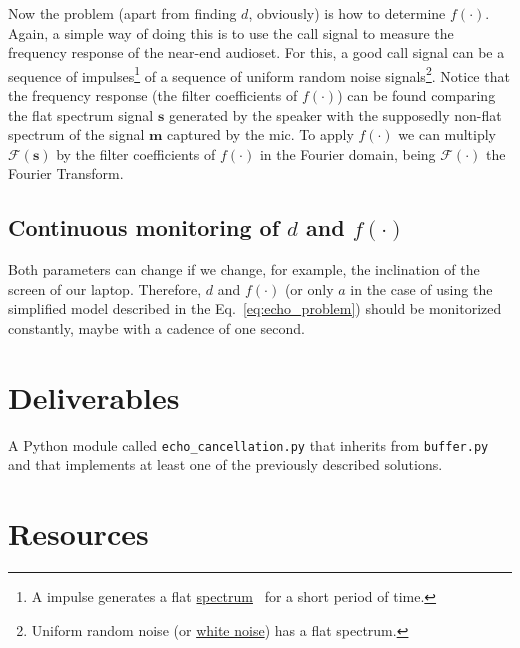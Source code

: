 Now the problem (apart from finding $d$, obviously) is how to
determine $f(\cdot)$. Again, a simple way of doing this is to use the
call signal to measure the frequency response of the near-end
audioset. For this, a good call signal can be a sequence of
impulses\footnote{A impulse generates a flat
  \href{https://en.wikipedia.org/wiki/Spectral_density}{spectrum}~\cite{kovacevic2013fourier,Oppenheim2}
  for a short period of time.} of a sequence of uniform random noise
signals\footnote{Uniform random noise (or
  \href{https://en.wikipedia.org/wiki/White_noise}{white noise}) has a
  flat spectrum.}. Notice that the frequency response (the filter
coefficients of $f(\cdot)$) can be found comparing the flat spectrum
signal ${\mathbf s}$ generated by the speaker with the supposedly
non-flat spectrum of the signal ${\mathbf m}$ captured by the mic.  To
apply $f(\cdot)$ we can multiply ${\mathcal F}({\mathbf s})$ by the
filter coefficients of $f(\cdot)$ in the Fourier domain, being
${\mathcal F}(\cdot)$ the Fourier Transform.

\subsection{Continuous monitoring of $d$ and $f(\cdot)$}

Both parameters can change if we change, for example, the inclination
of the screen of our laptop. Therefore, $d$ and $f(\cdot)$ (or only
$a$ in the case of using the simplified model described in the
Eq.~\eqref{eq:echo_problem}) should be monitorized constantly, maybe
with a cadence of one second.

\section{Deliverables}

A Python module called \texttt{echo\_cancellation.py} that inherits from
\texttt{buffer.py} and that implements at least one of the previously
described solutions.

\section{Resources}



\begin{comment}
http://www.seas.ucla.edu/dsplab/index.html
https://es.mathworks.com/help/signal/ug/echo-cancelation.html
https://dsp.stackexchange.com/questions/26617/echo-cancelling-using-autocorrelation-function
https://pypi.org/project/adaptfilt/
http://www.diva-portal.org/smash/get/diva2:280596/fulltext01
https://github.com/ThomasHaubner/e2e_dnn_ad_control_for_lin_aec
https://scicoding.com/4-ways-of-calculating-autocorrelation-in-python/
\end{comment}